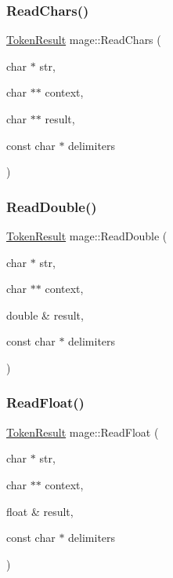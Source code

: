 \hypertarget{namespacemage_a5f2717cd5b7cfa9a43396e628e18a5d0}{}\label{namespacemage_a5f2717cd5b7cfa9a43396e628e18a5d0} 
\subsubsection{\texorpdfstring{Read\+Chars()}{ReadChars()}}
{\footnotesize\ttfamily \hyperlink{namespacemage_a2178ba2411db5912f41b2e7698c2037d}{Token\+Result} mage\+::\+Read\+Chars (\begin{DoxyParamCaption}\item[{char $\ast$}]{str,  }\item[{char $\ast$$\ast$}]{context,  }\item[{char $\ast$$\ast$}]{result,  }\item[{const char $\ast$}]{delimiters }\end{DoxyParamCaption})}

\hypertarget{namespacemage_a7ea0807bd21210be516463c68be91cb8}{}\label{namespacemage_a7ea0807bd21210be516463c68be91cb8} 
\subsubsection{\texorpdfstring{Read\+Double()}{ReadDouble()}}
{\footnotesize\ttfamily \hyperlink{namespacemage_a2178ba2411db5912f41b2e7698c2037d}{Token\+Result} mage\+::\+Read\+Double (\begin{DoxyParamCaption}\item[{char $\ast$}]{str,  }\item[{char $\ast$$\ast$}]{context,  }\item[{double \&}]{result,  }\item[{const char $\ast$}]{delimiters }\end{DoxyParamCaption})}

\hypertarget{namespacemage_a1856d70d5bbf0c311115f875222a6f1d}{}\label{namespacemage_a1856d70d5bbf0c311115f875222a6f1d} 
\subsubsection{\texorpdfstring{Read\+Float()}{ReadFloat()}}
{\footnotesize\ttfamily \hyperlink{namespacemage_a2178ba2411db5912f41b2e7698c2037d}{Token\+Result} mage\+::\+Read\+Float (\begin{DoxyParamCaption}\item[{char $\ast$}]{str,  }\item[{char $\ast$$\ast$}]{context,  }\item[{float \&}]{result,  }\item[{const char $\ast$}]{delimiters }\end{DoxyParamCaption})}

